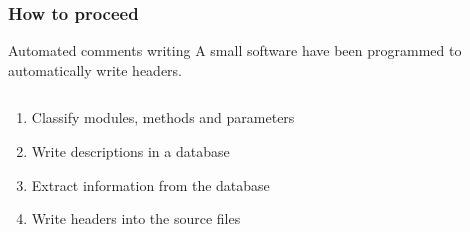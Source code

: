 \documentclass[10p]{beamer}
\begin{document}
\begin{frame}
\frametitle{How to proceed}
\begin{block}{Automated comments writing}
A small software have been programmed to automatically write headers.
\end{block}

\begin{columns}
\begin{column}{0.4\textwidth}
\begin{enumerate}
\item Classify modules, methods and parameters
\item Write descriptions in a database
\item Extract information from the database
\item Write headers into the source files
\end{enumerate}
\end{column}
\begin{column}{0.6\textwidth}
\end{column}
\end{columns}
\end{frame}
\end{document}
